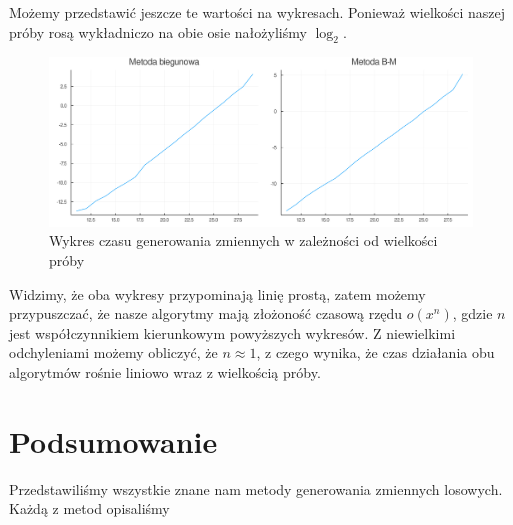\documentclass[12pt]{mwrep}
\begin{document}
	\noindent Możemy przedstawić jeszcze te wartości na wykresach. Ponieważ wielkości naszej próby rosą wykładniczo na obie osie nałożyliśmy $\log_2$. 
	\begin{figure}[H]\caption{Wykres czasu generowania zmiennych w zależności od wielkości próby}\label{fig:normal_time}
		\includegraphics[width=\columnwidth]{fig/fig_normal_time.png}
	\end{figure}
	\noindent Widzimy, że oba wykresy przypominają linię prostą, zatem możemy przypuszczać, że nasze algorytmy mają złożoność czasową rzędu $o(x^n)$, gdzie $n$ jest współczynnikiem kierunkowym powyższych wykresów. Z niewielkimi odchyleniami możemy obliczyć, że $n\approx 1$, z czego wynika, że czas działania obu algorytmów rośnie liniowo wraz z wielkością próby.

	
	\section{Podsumowanie}
	Przedstawiliśmy wszystkie znane nam metody generowania zmiennych losowych. Każdą z metod opisaliśmy
	
	
	
	
	
\end{document}
